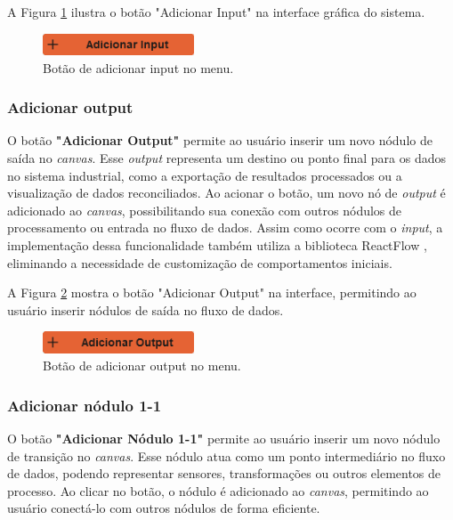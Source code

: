A Figura \ref{Fig:AddInputButton} ilustra o botão "Adicionar Input" na interface gráfica do sistema.

\begin{figure}[htbp]
    \centering
    \includegraphics[width=0.4\textwidth]{figuras/add-input-button.png}
    \caption{Botão de adicionar input no menu.}
    \label{Fig:AddInputButton}
\end{figure}


\subsubsection{Adicionar output}

O botão \textbf{"Adicionar Output"} permite ao usuário inserir um novo nódulo de saída no \textit{canvas}. Esse \textit{output} representa um destino ou ponto final para os dados no sistema industrial, como a exportação de resultados processados ou a visualização de dados reconciliados. Ao acionar o botão, um novo nó de \textit{output} é adicionado ao \textit{canvas}, possibilitando sua conexão com outros nódulos de processamento ou entrada no fluxo de dados. Assim como ocorre com o \textit{input}, a implementação dessa funcionalidade também utiliza a biblioteca ReactFlow \cite{reactflow}, eliminando a necessidade de customização de comportamentos iniciais.

A Figura \ref{Fig:AddOutputButton} mostra o botão "Adicionar Output" na interface, permitindo ao usuário inserir nódulos de saída no fluxo de dados.

\begin{figure}[htbp]
    \centering
    \includegraphics[width=0.4\textwidth]{figuras/add-output-button.png}
    \caption{Botão de adicionar output no menu.}
    \label{Fig:AddOutputButton}
\end{figure}

\subsubsection{Adicionar nódulo 1-1}

O botão \textbf{"Adicionar Nódulo 1-1"} permite ao usuário inserir um novo nódulo de transição no \textit{canvas}. Esse nódulo atua como um ponto intermediário no fluxo de dados, podendo representar sensores, transformações ou outros elementos de processo. Ao clicar no botão, o nódulo é adicionado ao \textit{canvas}, permitindo ao usuário conectá-lo com outros nódulos de forma eficiente.

